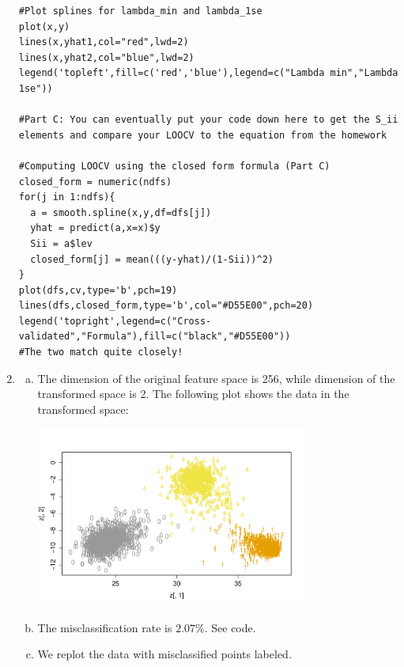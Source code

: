 \documentclass[10pt]{article}
\newcommand{\1}{\mathbbm{1}}
\begin{document}
\begin{enumerate}
{\begin{verbatim}
#Plot splines for lambda_min and lambda_1se
plot(x,y)
lines(x,yhat1,col="red",lwd=2)
lines(x,yhat2,col="blue",lwd=2)
legend('topleft',fill=c('red','blue'),legend=c("Lambda min","Lambda 1se"))

#Part C: You can eventually put your code down here to get the S_ii elements and compare your LOOCV to the equation from the homework

#Computing LOOCV using the closed form formula (Part C)
closed_form = numeric(ndfs)
for(j in 1:ndfs){
  a = smooth.spline(x,y,df=dfs[j])
  yhat = predict(a,x=x)$y
  Sii = a$lev
  closed_form[j] = mean(((y-yhat)/(1-Sii))^2)
}
plot(dfs,cv,type='b',pch=19)
lines(dfs,closed_form,type='b',col="#D55E00",pch=20)
legend('topright',legend=c("Cross-validated","Formula"),fill=c("black","#D55E00"))
#The two match quite closely!
\end{verbatim}
}


\item
\begin{enumerate}[(a)]
\item The dimension of the original feature space is 256, while dimension of the transformed space is 2. The following plot shows the data in the transformed space:
\begin{center}
\includegraphics[width=3.5in]{prob5_a_1.pdf}
\end{center}

\item The misclassification rate is $2.07\%$. See code.
\item We replot the data with misclassified points labeled.


\end{enumerate}
\end{enumerate}
\end{document}
